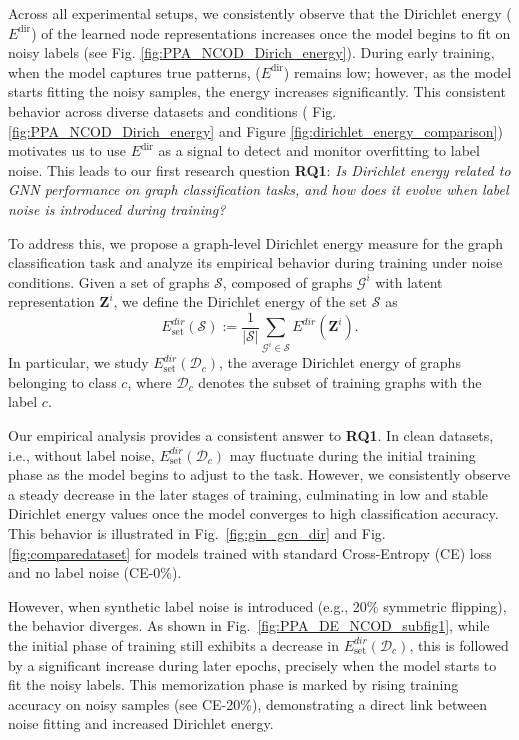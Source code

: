 Across all experimental setups, we consistently observe that the Dirichlet energy (\(E^{\text{dir}}\)) of the learned node representations increases once the model begins to fit on noisy labels (see Fig. \ref{fig:PPA_NCOD_Dirich_energy}). During early training, when the model captures true patterns, (\(E^{\text{dir}}\)) remains low; however, as the model starts fitting the noisy samples, the energy increases significantly. This consistent behavior across diverse datasets and conditions ( Fig. \ref{fig:PPA_NCOD_Dirich_energy} 
 and Figure \ref{fig:dirichlet_energy_comparison})  motivates us to use \(E^{\text{dir}}\) as a signal to detect and monitor overfitting to label noise. This leads to our first research question \textbf{RQ1}:\textit{ Is Dirichlet energy related to GNN performance on graph classification tasks, and how does it evolve when label noise is introduced during training?} 

To address this, we propose a graph-level Dirichlet energy measure for the graph classification task and analyze its empirical behavior during training under noise conditions.
Given a set of graphs $\mathcal{S}$, composed of graphs $\mathcal{G}^i$ with latent representation $\mathbf{Z}^i$, we define the Dirichlet energy of the set $\mathcal{S}$ as
\begin{equation}
    \label{eq: avg_dirichlet}
   E^{dir}_{\text{set}}(\mathcal{S}) := \frac{1}{|\mathcal{S}|} \sum_{\mathcal{G}^i \in \mathcal{S}}  E^{dir}(\mathbf{Z}^i).
\end{equation}
In particular, we study $E^{dir}_\text{set}(\mathcal{D}_c)$, the average Dirichlet energy of graphs belonging to class $c$, where $\mathcal{D}_c$ denotes the subset of training graphs with the label $c$. 

Our empirical analysis provides a consistent answer to \textbf{RQ1}. In clean datasets, i.e., without label noise, \( E^{dir}_{\text{set}}(\mathcal{D}_c) \) may fluctuate during the initial training phase as the model begins to adjust to the task. However, we consistently observe a steady decrease in the later stages of training, culminating in low and stable Dirichlet energy values once the model converges to high classification accuracy. This behavior is illustrated in Fig.~\ref{fig:gin_gcn_dir} and Fig. \ref{fig:comparedataset} for models trained with standard Cross-Entropy (CE) loss and no label noise (CE-0\%).

However, when synthetic label noise is introduced (e.g., 20\% symmetric flipping), the behavior diverges. As shown in Fig.~\ref{fig:PPA_DE_NCOD_subfig1}, while the initial phase of training still exhibits a decrease in \( E^{dir}_{\text{set}}(\mathcal{D}_c) \), this is followed by a significant increase during later epochs, precisely when the model starts to fit the noisy labels. This memorization phase is marked by rising training accuracy on noisy samples (see CE-20\%), demonstrating a direct link between noise fitting and increased Dirichlet energy.

